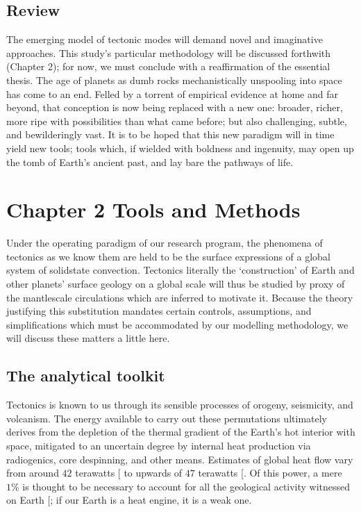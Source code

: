 \documentclass[letterpaper,10pt,english]{jupyterBook}
\begin{document}
\section{Review}
\label{\detokenize{content/chapter_01_background/main:review}}
\sphinxAtStartPar
The emerging model of tectonic modes will demand novel and imaginative approaches. This study’s particular methodology will be discussed forthwith (Chapter 2); for now, we must conclude with a reaffirmation of the essential thesis. The age of planets as dumb rocks mechanistically unspooling into space has come to an end. Felled by a torrent of empirical evidence at home and far beyond, that conception is now being replaced with a new one: broader, richer, more ripe with possibilities than what came before; but also challenging, subtle, and bewilderingly vast. It is to be hoped that this new paradigm will in time yield new tools; tools which, if wielded with boldness and ingenuity, may open up the tomb of Earth’s ancient past, and lay bare the pathways of life.


\chapter{Chapter 2 \sphinxhyphen{} Tools and Methods}
\label{\detokenize{content/chapter_02_methods/intro:chapter-2-tools-and-methods}}\label{\detokenize{content/chapter_02_methods/intro::doc}}
\sphinxAtStartPar
Under the operating paradigm of our research program, the phenomena of tectonics as we know them are held to be the surface expressions of a global system of solid\sphinxhyphen{}state convection. Tectonics \sphinxhyphen{} literally the ‘construction’ of Earth and other planets’ surface geology on a global scale \sphinxhyphen{} will thus be studied by proxy of the mantle\sphinxhyphen{}scale circulations which are inferred to motivate it. Because the theory justifying this substitution mandates certain controls, assumptions, and simplifications which must be accommodated by our modelling methodology, we will discuss these matters a little here.


\section{The analytical toolkit}
\label{\detokenize{content/chapter_02_methods/section1:the-analytical-toolkit}}\label{\detokenize{content/chapter_02_methods/section1::doc}}
\sphinxAtStartPar
Tectonics is known to us through its sensible processes of orogeny, seismicity, and volcanism. The energy available to carry out these permutations ultimately derives from the depletion of the thermal gradient of the Earth’s hot interior with space, mitigated to an uncertain degree by internal heat production via radiogenics, core despinning, and other means. Estimates of global heat flow vary from around \(42\) terawatts {[}\sphinxcite{references:id85}{]} to upwards of \(47\) terawatts {[}\sphinxcite{references:id108}{]}. Of this power, a mere \(1\%\) is thought to be necessary to account for all the geological activity witnessed on Earth {[}\sphinxcite{references:id88}{]}; if our Earth is a heat engine, it is a weak one.
\end{document}
